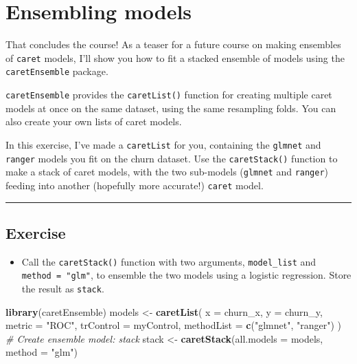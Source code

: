 \documentclass[]{book}
\newenvironment{Shaded}{\begin{snugshade}}{\end{snugshade}}
\newcommand{\KeywordTok}[1]{\textcolor[rgb]{0.13,0.29,0.53}{\textbf{#1}}}
\newcommand{\DataTypeTok}[1]{\textcolor[rgb]{0.13,0.29,0.53}{#1}}
\newcommand{\StringTok}[1]{\textcolor[rgb]{0.31,0.60,0.02}{#1}}
\newcommand{\CommentTok}[1]{\textcolor[rgb]{0.56,0.35,0.01}{\textit{#1}}}
\newcommand{\NormalTok}[1]{#1}
\providecommand{\tightlist}{%
  \setlength{\itemsep}{0pt}\setlength{\parskip}{0pt}}
\begin{document}
\section{Ensembling models}\label{ensembling-models}

That concludes the course! As a teaser for a future course on making
ensembles of \texttt{caret} models, I'll show you how to fit a stacked
ensemble of models using the \texttt{caretEnsemble} package.

\texttt{caretEnsemble} provides the \texttt{caretList()} function for
creating multiple caret models at once on the same dataset, using the
same resampling folds. You can also create your own lists of caret
models.

In this exercise, I've made a \texttt{caretList} for you, containing the
\texttt{glmnet} and \texttt{ranger} models you fit on the churn dataset.
Use the \texttt{caretStack()} function to make a stack of caret models,
with the two sub-models (\texttt{glmnet} and \texttt{ranger}) feeding
into another (hopefully more accurate!) \texttt{caret} model.

\begin{center}\rule{0.5\linewidth}{\linethickness}\end{center}

\subsection*{Exercise}\label{exercise-35}

\begin{itemize}
\tightlist
\item
  Call the \texttt{caretStack()} function with two arguments,
  \texttt{model\_list} and \texttt{method\ =\ "glm"}, to ensemble the
  two models using a logistic regression. Store the result as
  \texttt{stack}.
\end{itemize}

\begin{Shaded}
\begin{Highlighting}[]
\KeywordTok{library}\NormalTok{(caretEnsemble)}
\NormalTok{models <-}\StringTok{ }\KeywordTok{caretList}\NormalTok{(}
  \DataTypeTok{x =}\NormalTok{ churn_x, }\DataTypeTok{y =}\NormalTok{ churn_y,}
  \DataTypeTok{metric =} \StringTok{"ROC"}\NormalTok{,}
  \DataTypeTok{trControl =}\NormalTok{ myControl,}
  \DataTypeTok{methodList =} \KeywordTok{c}\NormalTok{(}\StringTok{"glmnet"}\NormalTok{, }\StringTok{"ranger"}\NormalTok{)}
\NormalTok{)}
\CommentTok{# Create ensemble model: stack}
\NormalTok{stack <-}\StringTok{ }\KeywordTok{caretStack}\NormalTok{(}\DataTypeTok{all.models =}\NormalTok{ models, }\DataTypeTok{method =} \StringTok{"glm"}\NormalTok{) }
\end{Highlighting}
\end{Shaded}
\end{document}
